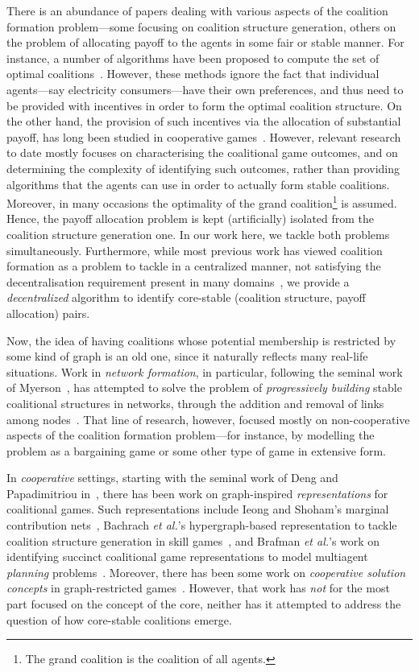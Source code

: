 \documentclass{aamas2012}
\begin{document}
\noindent There is an abundance of papers dealing with various aspects of the coalition formation problem---some focusing
on coalition structure generation, others on the problem of allocating payoff to the agents in some fair or stable manner.
For instance, a number of algorithms have been proposed to compute
the set of optimal coalitions~\cite{ecs18491,ecs9550,ecs17179}. However, these methods
ignore the fact that individual agents---say electricity consumers---have their own preferences,
and thus need to be provided with incentives in order to form the optimal coalition structure. 
On the other hand, the provision of such incentives via the allocation of substantial payoff, has long been studied in 
cooperative games~\cite{greco_ijcai,DBLP:journals/corr/abs-1102-1747,DBLP:conf/sigecom/ConitzerS03,deng94}. 
However, relevant research to date mostly focuses on 
characterising the coalitional game outcomes, and on determining the complexity of identifying such outcomes, rather
than providing algorithms that the agents can use in order to actually form
stable coalitions. Moreover, in many occasions the optimality  of the grand coalition\footnote{The grand coalition is the coalition of all
agents.}  is assumed. Hence, the payoff allocation problem is kept (artificially) isolated from the coalition structure generation one.
In our work here, we tackle both problems simultaneously.
Furthermore, while most previous work has viewed coalition formation
as a problem to tackle in a centralized manner, not satisfying the decentralisation requirement present in many domains~\cite{ecs9550,ecs17179},
we provide a {\em decentralized} algorithm to identify core-stable (coalition structure, payoff allocation) pairs.

Now, the idea of having coalitions whose potential membership is restricted by some kind of graph
is an old one, since it naturally reflects many real-life situations.
Work in {\em network formation}, in particular, following the seminal work of Myerson~\cite{myerson77}, has attempted to solve the problem of 
{\em progressively building} stable coalitional structures in networks, through the addition and removal of links among nodes~\cite{jackson2003}.
That line of research, however, focused mostly on non-cooperative aspects of the coalition formation problem---for instance, by modelling the problem
as a bargaining game or some other type of game in extensive form.

In {\em cooperative} settings, starting with the seminal work of Deng and Papadimitriou in~\cite{deng94}, 
there has been work on graph-inspired {\em representations} for coalitional games. Such representations include
Ieong and Shoham's marginal contribution nets~\cite{ieongmcnets}, Bachrach {\em et al.}'s hypergraph-based 
representation to tackle coalition structure generation in skill games~\cite{bachrach2010}, and Brafman {\em et al.}'s work on
identifying succinct coalitional game representations to model multiagent {\em planning} problems~\cite{TUplanning}.
Moreover, there has been some work on {\em cooperative solution concepts} in graph-restricted games~\cite{brink2006,meir2011}.
However, that work has {\em not} for the most part focused on the concept of the core, neither has it attempted to address the question of how core-stable
coalitions emerge.
\end{document}
